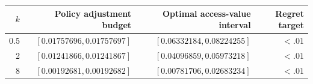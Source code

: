 \begin{tabular}{rrrr}
\toprule
$k$ & Policy adjustment budget & Optimal access-value interval & Regret target \\
\midrule
0.5 & $[0.01757696,0.01757697]$ & $[0.06332184,0.08224255]$ & $<.01$ \\
2 & $[0.01241866,0.01241867]$ & $[0.04096859,0.05973218]$ & $<.01$ \\
8 & $[0.00192681,0.00192682]$ & $[0.00781706,0.02683234]$ & $<.01$ \\
\bottomrule
\end{tabular}
